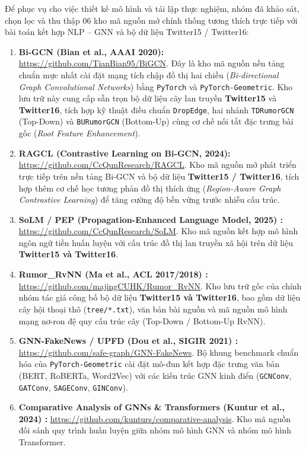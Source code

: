 \documentclass[11pt,a4paper]{extreport}
\begin{document}
{\sloppy
Để phục vụ cho việc thiết kế mô hình và tái lập thực nghiệm, nhóm đã khảo sát, chọn lọc và thu thập 06 kho mã nguồn mở chính thống tương thích trực tiếp với bài toán kết hợp NLP -- GNN và bộ dữ liệu Twitter15 / Twitter16:
\begin{enumerate}
    \item \textbf{Bi-GCN (Bian et al., AAAI 2020):} \url{https://github.com/TianBian95/BiGCN}. Đây là kho mã nguồn nền tảng chuẩn mực nhất cài đặt mạng tích chập đồ thị hai chiều (\textit{Bi-directional Graph Convolutional Networks}) bằng \texttt{PyTorch} và \texttt{PyTorch-Geometric}. Kho lưu trữ này cung cấp sẵn trọn bộ dữ liệu cây lan truyền \textbf{Twitter15} và \textbf{Twitter16}, tích hợp kỹ thuật điều chuẩn \texttt{DropEdge}, hai nhánh \texttt{TDRumorGCN} (Top-Down) và \texttt{BURumorGCN} (Bottom-Up) cùng cơ chế nối tắt đặc trưng bài gốc (\textit{Root Feature Enhancement}).
    \item \textbf{RAGCL (Contrastive Learning on Bi-GCN, 2024):} \url{https://github.com/CcQunResearch/RAGCL}. Kho mã nguồn mở phát triển trực tiếp trên nền tảng Bi-GCN và bộ dữ liệu \textbf{Twitter15 / Twitter16}, tích hợp thêm cơ chế học tương phản đồ thị thích ứng (\textit{Region-Aware Graph Contrastive Learning}) để tăng cường độ bền vững trước nhiễu cấu trúc.
    \item \textbf{SoLM / PEP (Propagation-Enhanced Language Model, 2025) \cite{noauthor_enhancing_2025}:} \url{https://github.com/CcQunResearch/SoLM}. Kho mã nguồn kết hợp mô hình ngôn ngữ tiền huấn luyện với cấu trúc đồ thị lan truyền xã hội trên dữ liệu \textbf{Twitter15 và Twitter16}.
    \item \textbf{Rumor\_RvNN (Ma et al., ACL 2017/2018) \cite{ma_detect_2017}:} \url{https://github.com/majingCUHK/Rumor_RvNN}. Kho lưu trữ gốc của chính nhóm tác giả công bố bộ dữ liệu \textbf{Twitter15 và Twitter16}, bao gồm dữ liệu cây hội thoại thô (\texttt{tree/*.txt}), văn bản bài nguồn và mã nguồn mô hình mạng nơ-ron đệ quy cấu trúc cây (Top-Down / Bottom-Up RvNN).
    \item \textbf{GNN-FakeNews / UPFD (Dou et al., SIGIR 2021) \cite{noauthor_ensemble_2024, noauthor_co-attention_2025}:} \url{https://github.com/safe-graph/GNN-FakeNews}. Bộ khung benchmark chuẩn hóa của \texttt{PyTorch-Geometric} cài đặt mô-đun kết hợp đặc trưng văn bản (BERT, RoBERTa, Word2Vec) với các kiến trúc GNN kinh điển (\texttt{GCNConv}, \texttt{GATConv}, \texttt{SAGEConv}, \texttt{GINConv}).
    \item \textbf{Comparative Analysis of GNNs \& Transformers (Kuntur et al., 2024) \cite{noauthor_comparative_2024}:} \url{https://github.com/kunturs/comparative-analysis}. Kho mã nguồn đối sánh quy trình huấn luyện giữa nhóm mô hình GNN và nhóm mô hình Transformer.
\end{enumerate}

\par}
\end{document}

